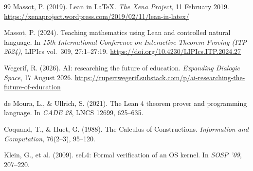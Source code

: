 \documentclass[11pt]{article}
\begin{document}
\begin{thebibliography}{99}
 Massot, P. (2019). Lean in \LaTeX{}. \emph{The Xena
Project}, 11 February 2019.
\url{https://xenaproject.wordpress.com/2019/02/11/lean-in-latex/}

 Massot, P. (2024). Teaching mathematics using Lean and
controlled natural language. In \emph{15th International Conference on
Interactive Theorem Proving (ITP 2024)}, LIPIcs vol.~309, 27:1--27:19.
\url{https://doi.org/10.4230/LIPIcs.ITP.2024.27}

 Wegerif, R. (2026). AI: researching the future of
education. \emph{Expanding Dialogic Space}, 17 August 2026.
\url{https://rupertwegerif.substack.com/p/ai-researching-the-future-of-education}

 de Moura, L., \& Ullrich, S. (2021). The Lean 4
theorem prover and programming language. In \emph{CADE 28}, LNCS 12699,
625--635.

 Coquand, T., \& Huet, G. (1988). The Calculus of
Constructions. \emph{Information and Computation}, 76(2--3), 95--120.

 Klein, G., et al. (2009). seL4: Formal verification of an
OS kernel. In \emph{SOSP '09}, 207--220.

\end{thebibliography}
\end{document}
